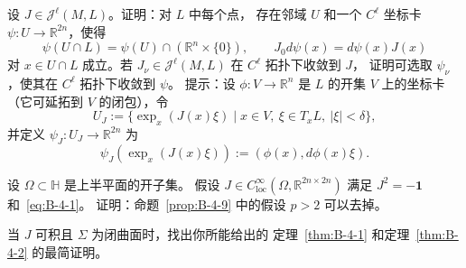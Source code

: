\begin{exercise}\label{ex:B-4-10}
设 $J\in\mathcal J^\ell(M,L)$。证明：对 $L$ 中每个点，
存在邻域 $U$ 和一个 $C^\ell$ 坐标卡 $\psi:U\to\mathbb R^{2n}$，使得
\[
  \psi(U\cap L)=\psi(U)\cap(\mathbb R^n\times\{0\}),\qquad
  J_0d\psi(x)=d\psi(x)J(x)
\]
对 $x\in U\cap L$ 成立。若
$J_\nu\in\mathcal J^\ell(M,L)$ 在 $C^\ell$ 拓扑下收敛到 $J$，
证明可选取 $\psi_\nu$，使其在 $C^\ell$ 拓扑下收敛到 $\psi$。
提示：设 $\phi:V\to\mathbb R^n$ 是 $L$ 的开集 $V$ 上的坐标卡
（它可延拓到 $V$ 的闭包），令
\[
  U_J:=\{\exp_x(J(x)\xi)\mid x\in V,\ \xi\in T_xL,\ |\xi|<\delta\},
\]
并定义 $\psi_J:U_J\to\mathbb R^{2n}$ 为
\[
  \psi_J(\exp_x(J(x)\xi)) := (\phi(x),d\phi(x)\xi).
\]
\end{exercise}

\begin{exercise}\label{ex:B-4-11}
设 $\Omega\subset\mathbb H$ 是上半平面的开子集。
假设 $J\in C^\infty_{\mathrm{loc}}(\Omega,\mathbb R^{2n\times2n})$
满足 $J^2=-\mathbf 1$ 和~\eqref{eq:B-4-1}。
证明：命题~\ref{prop:B-4-9} 中的假设 $p>2$ 可以去掉。
\end{exercise}

\begin{exercise}\label{ex:B-4-12}
当 $J$ 可积且 $\Sigma$ 为闭曲面时，找出你所能给出的
定理~\ref{thm:B-4-1} 和定理~\ref{thm:B-4-2} 的最简证明。
\end{exercise}
